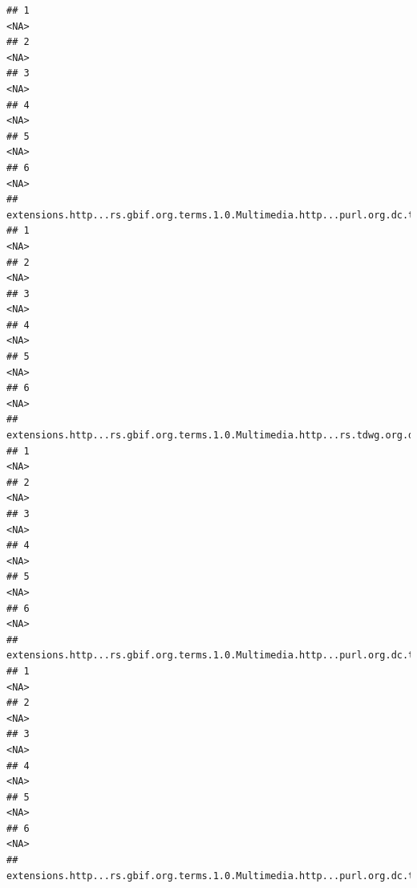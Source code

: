 \documentclass[
]{book}
\begin{document}
\begin{verbatim}
## 1                                                                                     <NA>
## 2                                                                                     <NA>
## 3                                                                                     <NA>
## 4                                                                                     <NA>
## 5                                                                                     <NA>
## 6                                                                                     <NA>
##   extensions.http...rs.gbif.org.terms.1.0.Multimedia.http...purl.org.dc.terms.type.4
## 1                                                                               <NA>
## 2                                                                               <NA>
## 3                                                                               <NA>
## 4                                                                               <NA>
## 5                                                                               <NA>
## 6                                                                               <NA>
##   extensions.http...rs.gbif.org.terms.1.0.Multimedia.http...rs.tdwg.org.dwc.terms.catalogNumber.4
## 1                                                                                            <NA>
## 2                                                                                            <NA>
## 3                                                                                            <NA>
## 4                                                                                            <NA>
## 5                                                                                            <NA>
## 6                                                                                            <NA>
##   extensions.http...rs.gbif.org.terms.1.0.Multimedia.http...purl.org.dc.terms.publisher.4
## 1                                                                                    <NA>
## 2                                                                                    <NA>
## 3                                                                                    <NA>
## 4                                                                                    <NA>
## 5                                                                                    <NA>
## 6                                                                                    <NA>
##   extensions.http...rs.gbif.org.terms.1.0.Multimedia.http...purl.org.dc.terms.license.4

\end{verbatim}
\end{document}
